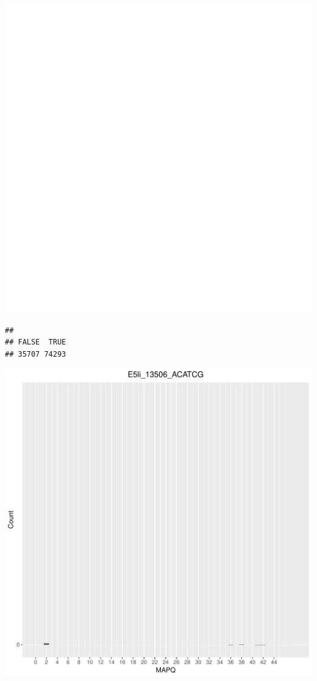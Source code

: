 \documentclass[12pt, a4paper]{article}\usepackage[]{graphicx}\usepackage[]{color}
\makeatletter
\def\maxwidth{ %
  \ifdim\Gin@nat@width>\linewidth
    \linewidth
  \else
    \Gin@nat@width
  \fi
}
\newenvironment{kframe}{%
 \def\at@end@of@kframe{}%
 \ifinner\ifhmode%
  \def\at@end@of@kframe{\end{minipage}}%
  \begin{minipage}{\columnwidth}%
 \fi\fi%
 \def\FrameCommand##1{\hskip\@totalleftmargin \hskip-\fboxsep
 \colorbox{shadecolor}{##1}\hskip-\fboxsep
     \hskip-\linewidth \hskip-\@totalleftmargin \hskip\columnwidth}%
 \MakeFramed {\advance\hsize-\width
   \@totalleftmargin\z@ \linewidth\hsize
   \@setminipage}}%
 {\par\unskip\endMakeFramed%
 \at@end@of@kframe}
\newenvironment{knitrout}{}{} %
\makeatother
\begin{document}
\begin{knitrout}
\includegraphics[width=\maxwidth]{figure/unnamed-chunk-3-16} 
\begin{kframe}\begin{verbatim}
## 
## FALSE  TRUE 
## 35707 74293
\end{verbatim}
\end{kframe}
\includegraphics[width=\maxwidth]{figure/unnamed-chunk-3-17} 


\end{knitrout}
\end{document}
